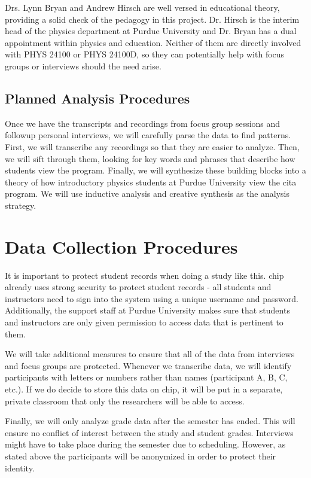 Drs. Lynn Bryan and Andrew Hirsch are well versed in educational theory, providing a solid check of the pedagogy in this project. Dr. Hirsch is the interim head of the physics department at Purdue University and Dr. Bryan has a dual appointment within physics and education. Neither of them are directly involved with PHYS 24100 or PHYS 24100D, so they can potentially help with focus groups or interviews should the need arise.

\subsection{Planned Analysis Procedures}

Once we have the transcripts and recordings from focus group sessions and followup personal interviews, we will carefully parse the data to find patterns. First, we will transcribe any recordings so that they are easier to analyze. Then, we will sift through them, looking for key words and phrases that describe how students view the program. Finally, we will synthesize these building blocks into a theory of how introductory physics students at Purdue University view the \gls{cita} program. We will use inductive analysis and creative synthesis as the analysis strategy.

\section{Data Collection Procedures}

It is important to protect student records when doing a study like this. \gls{chip} already uses strong security to protect student records - all students and instructors need to sign into the system using a unique username and password. Additionally, the support staff at Purdue University makes sure that students and instructors are only given permission to access data that is pertinent to them.

We will take additional measures to ensure that all of the data from interviews and focus groups are protected. Whenever we transcribe data, we will identify participants with letters or numbers rather than names (participant A, B, C, etc.). If we do decide to store this data on \gls{chip}, it will be put in a separate, private classroom that only the researchers will be able to access.

Finally, we will only analyze grade data after the semester has ended. This will ensure no conflict of interest between the study and student grades. Interviews might have to take place during the semester due to scheduling. However, as stated above the participants will be anonymized in order to protect their identity.

